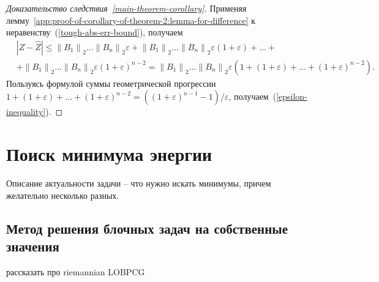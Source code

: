 \begin{proof}[Доказательство следствия~\ref{main-theorem-corollary}]
Применяя лемму~\ref{app:proof-of-corollary-of-theorem-2:lemma-for-difference} к неравенству~(\ref{tough-abs-err-bound}), получаем
\begin{align*}
&|Z - \widehat{Z}| \leq \left\| B_1 \right\|_2 \ldots \left\| B_n \right\|_2 \varepsilon +
\left\| B_1 \right\|_2 \ldots \left\| B_n \right\|_2 \varepsilon (1 + \varepsilon) + \ldots + \\
&+ \left\| B_1 \right\|_2 \ldots \left\| B_n \right\|_2 \varepsilon (1 + \varepsilon)^{n - 2} =
\left\| B_1 \right\|_2 \ldots \left\| B_n \right\|_2 \varepsilon (1 + (1 + \varepsilon) + \ldots + (1 + \varepsilon)^{n - 2}).
\end{align*}
Пользуясь формулой суммы геометрической прогрессии $1 + (1 + \varepsilon) + \ldots + (1 + \varepsilon)^{n - 2} = ((1 + \varepsilon)^{n - 1} - 1) / \varepsilon$, получаем~(\ref{epsilon-inequality}).
\end{proof}

\section{Поиск минимума энергии}
Описание актуальности задачи -- что нужно искать минимумы, причем желательно несколько разных.
\subsection{Метод решения блочных задач на собственные значения}
\alert{рассказать про riemannian LOBPCG}
